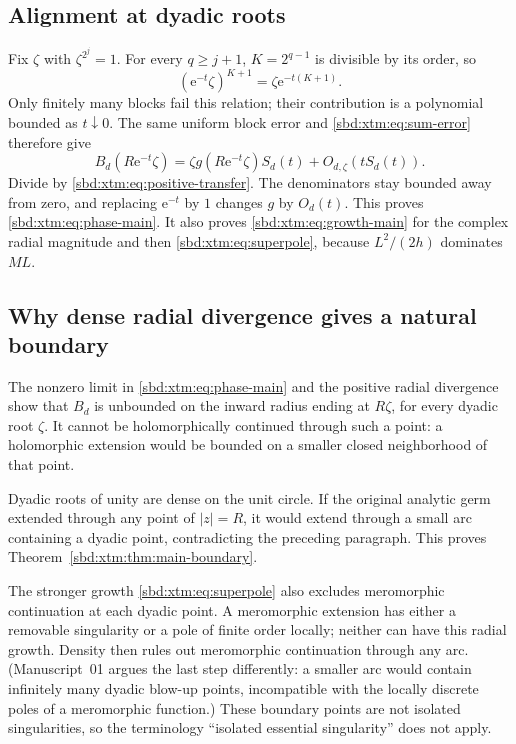 \documentclass[11pt,a4paper]{article}
\theoremstyle{definition}
\newcommand{\e}{\mathrm e}
\begin{document}
\subsection{Alignment at dyadic roots}
Fix $\zeta$ with $\zeta^{2^j}=1$. For every $q\ge j+1$, $K=2^{q-1}$ is
divisible by its order, so
\begin{equation}\label{sbd:xtm:eq:phase-align}
 (\e^{-t}\zeta)^{K+1}=\zeta\e^{-t(K+1)}.
\end{equation}
Only finitely many blocks fail this relation; their contribution is a
polynomial bounded as $t\downarrow0$. The same uniform block error and
\eqref{sbd:xtm:eq:sum-error} therefore give
\begin{equation}\label{sbd:xtm:eq:complex-transfer}
 B_d(R\e^{-t}\zeta)
 =\zeta g(R\e^{-t}\zeta)S_d(t)+O_{d,\zeta}(tS_d(t)).
\end{equation}
Divide by \eqref{sbd:xtm:eq:positive-transfer}. The denominators stay bounded
away from zero, and replacing $\e^{-t}$ by $1$ changes $g$ by $O_d(t)$.
This proves \eqref{sbd:xtm:eq:phase-main}. It also proves
\eqref{sbd:xtm:eq:growth-main} for the complex radial magnitude and then
\eqref{sbd:xtm:eq:superpole}, because $L^2/(2h)$ dominates $ML$.

\subsection{Why dense radial divergence gives a natural boundary}
The nonzero limit in \eqref{sbd:xtm:eq:phase-main} and the positive radial
divergence show that $B_d$ is unbounded on the inward radius ending at
$R\zeta$, for every dyadic root $\zeta$. It cannot be holomorphically
continued through such a point: a holomorphic extension would be bounded
on a smaller closed neighborhood of that point.

Dyadic roots of unity are dense on the unit circle. If the original
analytic germ extended through any point of $|z|=R$, it would extend
through a small arc containing a dyadic point, contradicting the preceding
paragraph. This proves Theorem~\ref{sbd:xtm:thm:main-boundary}.

The stronger growth \eqref{sbd:xtm:eq:superpole} also excludes meromorphic
continuation at each dyadic point. A meromorphic extension has either a
removable singularity or a pole of finite order locally; neither can have
this radial growth. Density then rules out meromorphic continuation through
any arc. (Manuscript~01 argues the last step differently: a smaller arc
would contain infinitely many dyadic blow-up points, incompatible with the
locally discrete poles of a meromorphic function.) These boundary points
are not isolated singularities, so the terminology ``isolated essential
singularity'' does not apply.
\end{document}
